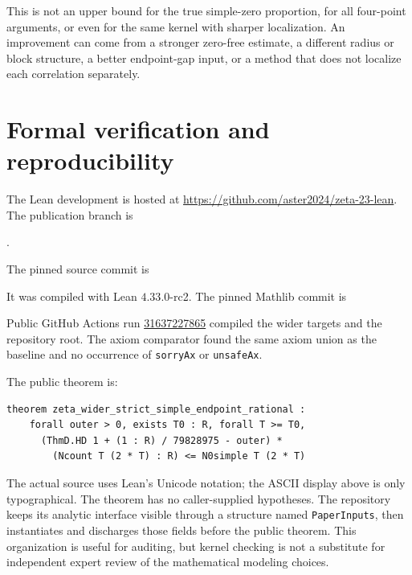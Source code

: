 \documentclass[11pt,reqno]{amsart}
\theoremstyle{definition}
\theoremstyle{remark}
\begin{document}
This is not an upper bound for the true simple-zero proportion, for all
four-point arguments, or even for the same kernel with sharper localization.
An improvement can come from a stronger zero-free estimate, a different
radius or block structure, a better endpoint-gap input, or a method that does
not localize each correlation separately.

\section{Formal verification and reproducibility}

The Lean development is hosted at
\url{https://github.com/aster2024/zeta-23-lean}.  The publication branch is
\begin{center}
\small{}.
\end{center}
The pinned source commit is
\begin{center}
\small{}
\end{center}
It was compiled with Lean $4.33.0$-rc2.  The pinned Mathlib commit is
\begin{center}
\small{}
\end{center}
Public GitHub Actions run
\href{https://github.com/aster2024/zeta-23-lean/actions/runs/31637227865}{31637227865}
compiled the wider targets and the repository root.  The axiom comparator
found the same axiom union as the baseline and no occurrence of
\texttt{sorryAx} or \texttt{unsafeAx}.

The public theorem is:
\begin{verbatim}
theorem zeta_wider_strict_simple_endpoint_rational :
    forall outer > 0, exists T0 : R, forall T >= T0,
      (ThmD.HD 1 + (1 : R) / 79828975 - outer) *
        (Ncount T (2 * T) : R) <= N0simple T (2 * T)
\end{verbatim}
The actual source uses Lean's Unicode notation; the ASCII display above is
only typographical.  The theorem has no caller-supplied hypotheses.  The
repository keeps its analytic interface visible through a structure named
\texttt{PaperInputs}, then instantiates and discharges those fields before the
public theorem.  This organization is useful for auditing, but kernel
checking is not a substitute for independent expert review of the
mathematical modeling choices.
\end{document}
